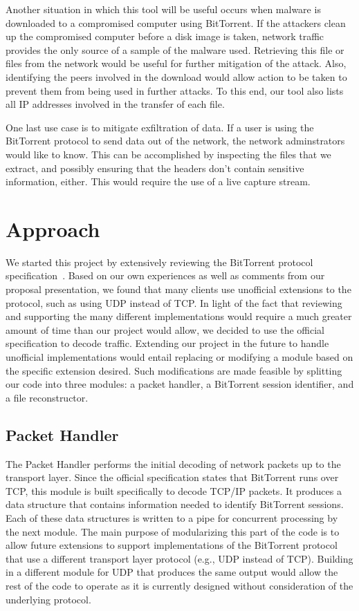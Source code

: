 \documentclass{acm_proc_article-sp}
\begin{document}
Another situation in which this tool will be useful occurs when malware is
downloaded to a compromised computer using BitTorrent. If the attackers clean up
the compromised computer before a disk image is taken, network traffic provides
the only source of a sample of the malware used. Retrieving this file or files
from the network would be useful for further mitigation of the attack. Also,
identifying the peers involved in the download would allow action to be taken to
prevent them from being used in further attacks. To this end, our tool also
lists all IP addresses involved in the transfer of each file.

One last use case is to mitigate exfiltration of data.  If a user is
using the BitTorrent protocol to send data out of the network, the network
adminstrators would like to know.  This can be accomplished by inspecting the
files that we extract, and possibly ensuring that the headers don't contain
sensitive information, either.  This would require the use of a live capture stream.



\section{Approach}
We started this project by extensively reviewing the BitTorrent protocol
specification~\cite{officialspec}.  Based on our own experiences as well as
comments from our proposal presentation, we found that many clients use
unofficial extensions to the protocol, such as using UDP instead of TCP. In
light of the fact that reviewing and supporting the many different
implementations would require a much greater amount of time than our project
would allow, we decided to use the official specification to decode
traffic. Extending our project in the future to handle unofficial
implementations would entail replacing or modifying a module based on the
specific extension desired. Such modifications are made feasible by splitting
our code into three modules: a packet handler, a BitTorrent session identifier,
and a file reconstructor.

\subsection{Packet Handler}
The Packet Handler performs the initial decoding of network packets up to the
transport layer. Since the official specification states that BitTorrent runs
over TCP, this module is built specifically to decode TCP/IP packets. It
produces a data structure that contains information needed to identify
BitTorrent sessions. Each of these data structures is written to a pipe for
concurrent processing by the next module. The main purpose of modularizing this
part of the code is to allow future extensions to support implementations of the
BitTorrent protocol that use a different transport layer protocol (e.g., UDP
instead of TCP). Building in a different module for UDP that produces the same
output would allow the rest of the code to operate as it is currently designed
without consideration of the underlying protocol.
\end{document}
